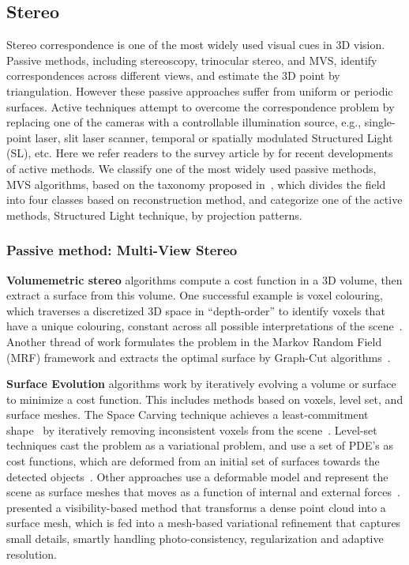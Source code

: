 \subsection{Stereo}
Stereo correspondence is one of the most widely used visual cues in 3D vision. Passive methods, including stereoscopy, trinocular stereo, and MVS, identify correspondences across different views, and estimate the 3D point by triangulation. However these passive approaches suffer from uniform or periodic surfaces. Active techniques attempt to overcome the correspondence problem by replacing one of the cameras with a controllable illumination source, e.g., single-point laser, slit laser scanner, temporal or spatially modulated Structured Light (SL), etc. Here we refer readers to the survey article by \citeauthor{blais2004review} for recent developments of active methods. We classify one of the most widely used passive methods, MVS algorithms, based on the taxonomy proposed in~\cite{seitz2006comparison}, which divides the field into four classes based on reconstruction method, and categorize one of the active methods, Structured Light technique, by projection patterns.

\subsubsection{Passive method: Multi-View Stereo}
\textbf{Volumemetric stereo} algorithms compute a cost function in a 3D volume, then extract a surface from this volume. One successful example is voxel colouring, which traverses a discretized 3D space in “depth-order” to identify voxels that have a unique colouring, constant across all possible interpretations of the scene~\cite{seitz1997photorealistic}. Another thread of work formulates the problem in the Markov Random Field (MRF) framework and extracts the optimal surface by Graph-Cut algorithms~\cite{roy1998maximum,vogiatzis2005multi,vogiatzis2007multiview}.

\textbf{Surface Evolution} algorithms work by iteratively evolving a volume or surface to minimize a cost function. This includes methods based on voxels, level set, and surface meshes. The Space Carving technique achieves a least-commitment shape~\cite{marr1982vision} by iteratively removing inconsistent voxels from the scene~\cite{kutulakos2000theory}. Level-set techniques cast the problem as a variational problem, and use a set of PDE's as cost functions, which are deformed from an initial set of surfaces towards the detected objects~\cite{faugeras2002variational}. Other approaches use a deformable model and represent the scene as surface meshes that moves as a function of internal and external forces~\cite{esteban2004silhouette}. \citeauthor{hiep2009towards} presented a visibility-based method that transforms a dense point cloud into a surface mesh, which is fed into a mesh-based variational refinement that captures small details, smartly handling photo-consistency, regularization and adaptive resolution.

